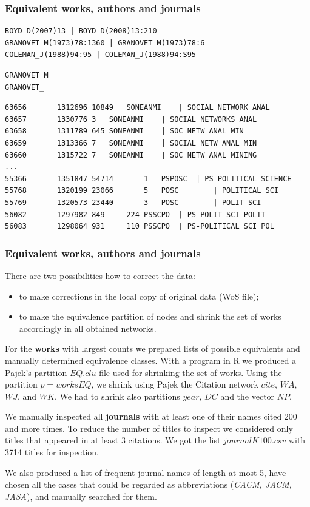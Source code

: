 \documentclass[hyperref={pdfstartview={FitBH -32768},
                         pdfpagemode=FullScreen,
                         plainpages=false,
                         colorlinks=true}
              ]{beamer}
\begin{document}
\begin{frame}[fragile]
\frametitle{Equivalent works, authors and journals}
\footnotesize

\begin{verbatim}
BOYD_D(2007)13 | BOYD_D(2008)13:210
GRANOVET_M(1973)78:1360 | GRANOVET_M(1973)78:6
COLEMAN_J(1988)94:95 | COLEMAN_J(1988)94:S95
\end{verbatim}

\begin{verbatim}
GRANOVET_M
GRANOVET_
\end{verbatim}

\begin{verbatim}
63656		1312696	10849	SONEANMI	| SOCIAL NETWORK ANAL
63657		1330776	3	SONEANMI	| SOCIAL NETWORKS ANAL
63658		1311789	645	SONEANMI	| SOC NETW ANAL MIN
63659		1313366	7	SONEANMI	| SOCIAL NETW ANAL MIN
63660		1315722	7	SONEANMI	| SOC NETW ANAL MINING
...
55366		1351847	54714		1	PSPOSC 	| PS POLITICAL SCIENCE
55768		1320199	23066		5	POSC		| POLITICAL SCI
55769		1320573	23440		3	POSC		| POLIT SCI
56082		1297982	849		224	PSSCPO	| PS-POLIT SCI POLIT
56083		1298064	931		110	PSSCPO	| PS-POLITICAL SCI POL
\end{verbatim}
\end{frame}

\begin{frame}[fragile]
\frametitle{Equivalent works, authors and journals}
\footnotesize

There are two possibilities how to correct the data:
\begin{itemize}
\item to make corrections in the local copy of original data (WoS file);
\item to make the equivalence partition of nodes and shrink the set of works accordingly in all  obtained networks.
\end{itemize}

For the \textbf{works} with largest counts we prepared lists of possible equivalents and manually determined equivalence classes. With a program in R we produced a Pajek's partition $EQ.clu$ file used for shrinking the set of works. Using the partition $p=worksEQ$, we shrink using Pajek the Citation network $cite$, $WA$, $WJ$, and $WK$. We had to shrink also partitions $year$,  $DC$ and the vector $NP$. \smallskip 

We manually inspected all \textbf{journals} with at least one of their names cited 200 and more times. To  reduce the number of titles to inspect we considered only titles that appeared in at least 3 citations. We got the list $journalK100.csv$ with 3714 titles for inspection.\smallskip  

We also produced a list of frequent journal names of length at most 5, have chosen all the cases that could be regarded as abbreviations (\textit{CACM, JACM, JASA}), and manually searched for them. 
\end{frame}
\end{document}
